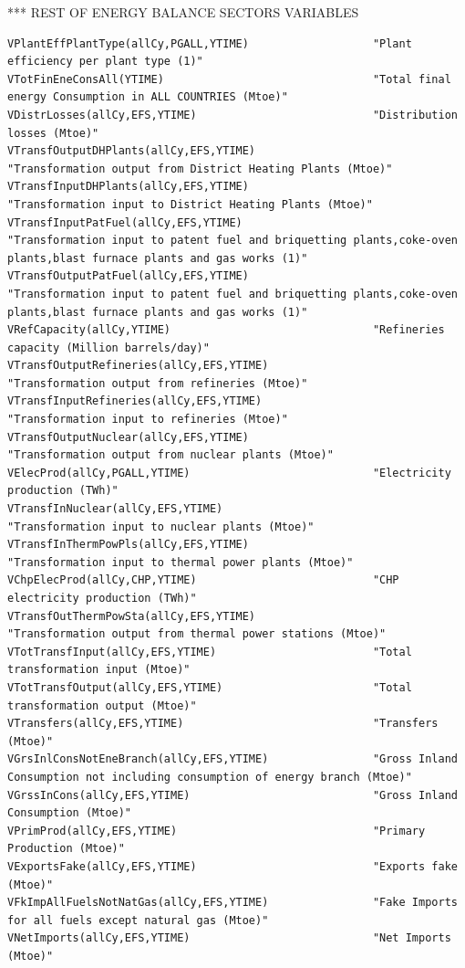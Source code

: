 \documentclass[a4paper,]{scrartcl}
\begin{document}
*** REST OF ENERGY BALANCE SECTORS VARIABLES

\begin{lstlisting}
VPlantEffPlantType(allCy,PGALL,YTIME)                   "Plant efficiency per plant type (1)"
VTotFinEneConsAll(YTIME)                                "Total final energy Consumption in ALL COUNTRIES (Mtoe)"
VDistrLosses(allCy,EFS,YTIME)                           "Distribution losses (Mtoe)"
VTransfOutputDHPlants(allCy,EFS,YTIME)                  "Transformation output from District Heating Plants (Mtoe)"
VTransfInputDHPlants(allCy,EFS,YTIME)                   "Transformation input to District Heating Plants (Mtoe)"
VTransfInputPatFuel(allCy,EFS,YTIME)                    "Transformation input to patent fuel and briquetting plants,coke-oven plants,blast furnace plants and gas works (1)"
VTransfOutputPatFuel(allCy,EFS,YTIME)                   "Transformation input to patent fuel and briquetting plants,coke-oven plants,blast furnace plants and gas works (1)"
VRefCapacity(allCy,YTIME)                               "Refineries capacity (Million barrels/day)" 
VTransfOutputRefineries(allCy,EFS,YTIME)                "Transformation output from refineries (Mtoe)"
VTransfInputRefineries(allCy,EFS,YTIME)                 "Transformation input to refineries (Mtoe)" 
VTransfOutputNuclear(allCy,EFS,YTIME)                   "Transformation output from nuclear plants (Mtoe)"
VElecProd(allCy,PGALL,YTIME)                            "Electricity production (TWh)"
VTransfInNuclear(allCy,EFS,YTIME)                       "Transformation input to nuclear plants (Mtoe)"     
VTransfInThermPowPls(allCy,EFS,YTIME)                   "Transformation input to thermal power plants (Mtoe)"
VChpElecProd(allCy,CHP,YTIME)                           "CHP electricity production (TWh)"
VTransfOutThermPowSta(allCy,EFS,YTIME)                  "Transformation output from thermal power stations (Mtoe)"
VTotTransfInput(allCy,EFS,YTIME)                        "Total transformation input (Mtoe)"
VTotTransfOutput(allCy,EFS,YTIME)                       "Total transformation output (Mtoe)"
VTransfers(allCy,EFS,YTIME)                             "Transfers (Mtoe)"
VGrsInlConsNotEneBranch(allCy,EFS,YTIME)                "Gross Inland Consumption not including consumption of energy branch (Mtoe)"
VGrssInCons(allCy,EFS,YTIME)                            "Gross Inland Consumption (Mtoe)"
VPrimProd(allCy,EFS,YTIME)                              "Primary Production (Mtoe)" 
VExportsFake(allCy,EFS,YTIME)                           "Exports fake (Mtoe)"       
VFkImpAllFuelsNotNatGas(allCy,EFS,YTIME)                "Fake Imports for all fuels except natural gas (Mtoe)"
VNetImports(allCy,EFS,YTIME)                            "Net Imports (Mtoe)"
\end{lstlisting}
\end{document}
